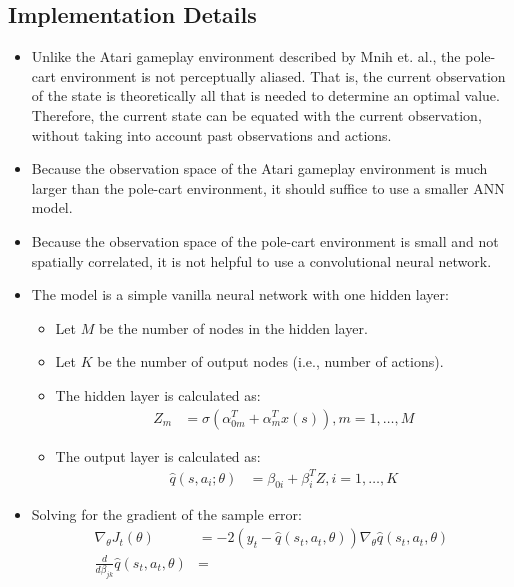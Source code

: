 \documentclass[a4paper]{article}
\begin{document}
\subsection*{Implementation Details}
\begin{itemize}
    \item Unlike the Atari gameplay environment described by Mnih et. al., the
        pole-cart environment is not perceptually aliased. That is, the current
        observation of the state is theoretically all that is needed to
        determine an optimal value. Therefore, the current state can be equated
        with the current observation, without taking into account past
        observations and actions.
    \item Because the observation space of the Atari gameplay environment is
        much larger than the pole-cart environment, it should suffice to use a
        smaller ANN model.
    \item Because the observation space of the pole-cart environment is small
        and not spatially correlated, it is not helpful to use a convolutional
        neural network.
    \item The model is a simple vanilla neural network with one hidden layer:
    \begin{itemize}
        \item Let $M$ be the number of nodes in the hidden layer.
        \item Let $K$ be the number of output nodes (i.e., number of actions).
        \item The hidden layer is calculated as:
        \begin{align*}
            Z_{m} &= \sigma(\alpha^{T}_{0m} + \alpha^{T}_{m}x(s)), m = 1, \dots, M
        \end{align*}
        \item The output layer is calculated as:
        \begin{align*}
            \hat{q}(s, a_i; \theta) &= \beta_{0i} + \beta^{T}_{i}Z, i = 1, \dots, K
        \end{align*}
    \end{itemize}
    \item Solving for the gradient of the sample error:
    \begin{align*}
        \nabla_{\theta}J_t(\theta) &= -2(y_t - \hat{q}(s_t, a_t, \theta))
        \nabla_{\theta}\hat{q}(s_t, a_t, \theta)\\
        \frac{d}{d\beta_{jk}}\hat{q}(s_t, a_t, \theta) &=

\end{align*}
\end{itemize}
\end{document}
